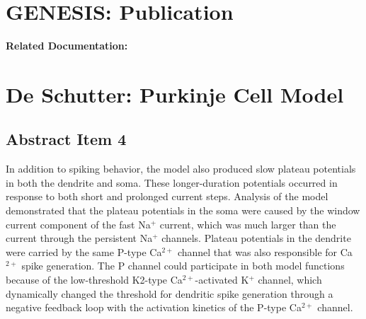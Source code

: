 \documentclass[12pt]{article}
\begin{document}
\section*{GENESIS: Publication}

{\bf Related Documentation:}

\section*{De Schutter: Purkinje Cell Model}

\subsection*{Abstract Item 4}

In addition to spiking behavior, the model also produced
slow plateau potentials in both the dendrite and soma. These
longer-duration potentials occurred in response to both short and
prolonged current steps. Analysis of the model demonstrated that
the plateau potentials in the soma were caused by the window
current component of the fast Na$^+$ current, which was much
larger than the current through the persistent Na$^+$ channels.
Plateau potentials in the dendrite were carried by the same P-type
Ca$^{2+}$ channel that was also responsible for Ca$^{2+}$ spike generation.
The P channel could participate in both model functions because
of the low-threshold K2-type Ca$^{2+}$-activated K$^+$ channel, which
dynamically changed the threshold for dendritic spike generation
through a negative feedback loop with the activation kinetics of
the P-type Ca$^{2+}$ channel.
\end{document}
